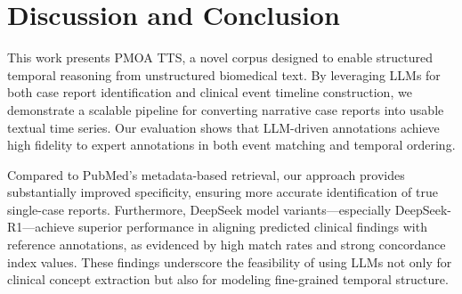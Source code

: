 \documentclass[pmlr]{jmlr}%
\begin{document}

\section{Discussion and Conclusion}

This work presents PMOA TTS, a novel corpus designed to enable structured temporal reasoning from unstructured biomedical text. By leveraging LLMs for both case report identification and clinical event timeline construction, we demonstrate a scalable pipeline for converting narrative case reports into usable textual time series. Our evaluation shows that LLM-driven annotations achieve high fidelity to expert annotations in both event matching and temporal ordering.

Compared to PubMed's metadata-based retrieval, our approach provides substantially improved specificity, ensuring more accurate identification of true single-case reports. Furthermore, DeepSeek model variants—especially DeepSeek-R1—achieve superior performance in aligning predicted clinical findings with reference annotations, as evidenced by high match rates and strong concordance index values. These findings underscore the feasibility of using LLMs not only for clinical concept extraction but also for modeling fine-grained temporal structure.
\end{document}
